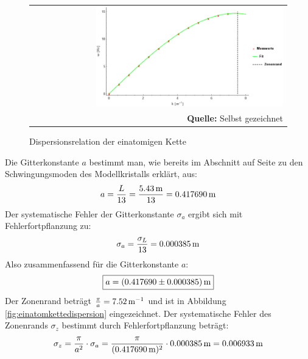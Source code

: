 \documentclass[a4paper,titlepage]{scrartcl}
\numberwithin{equation}{section}
\begin{document}
\begin{figure}[H]
	\centering
	\begin{tabular}{@{}r@{}}
		\includegraphics[width=0.75\textwidth]{images/dispersionsrelationeinatom.png}\\
		\footnotesize\sffamily\textbf{Quelle:} Selbst gezeichnet
	\end{tabular}
	\caption{Dispersionsrelation der einatomigen Kette}
    \label{fig:dispersionsrelationeinatom}
\end{figure}
Die Gitterkonstante $a$ bestimmt man, wie bereits im Abschnitt auf Seite \pageref{eq:einatommodell} zu den Schwingungsmoden des Modellkristalls erklärt, aus:
\begin{equation*}
a=\frac{L}{13}=\frac{\unit[5.43]{m}}{13}=\unit[0.417690]{m}
\end{equation*}
Der systematische Fehler der Gitterkonstante $\sigma_a$ ergibt sich mit Fehlerfortpflanzung zu:
\begin{equation*}
\sigma_a=\frac{\sigma_L}{13}=\unit[0.000385]{m}
\end{equation*}
Also zusammenfassend für die Gitterkonstante $a$:
\begin{equation*}
\boxed{a=\unit[(0.417690 \pm 0.000385)]{m}}
\end{equation*}
Der Zonenrand beträgt $\frac{\pi}{a}=\unit[7.52]{m^{-1}}$ und ist in Abbildung \ref{fig:einatomkettedispersion} eingezeichnet. Der systematische Fehler des Zonenrands $\sigma_z$ bestimmt durch Fehlerfortpflanzung beträgt:
\begin{equation*}
\sigma_z=\frac{\pi}{a^2} \cdot \sigma_a=\frac{\pi}{(\unit[0.417690]{m})^2} \cdot \unit[0.000385]{m}=\unit[0.006933]{m}
\end{equation*}
\end{document}
